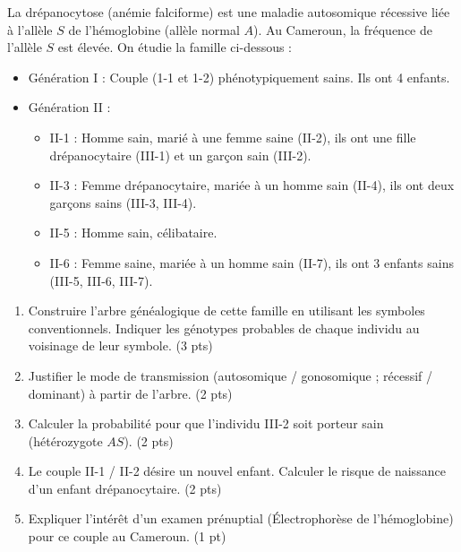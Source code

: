 \documentclass[11pt]{article}
\begin{document}
\begin{exercice}
La drépanocytose (anémie falciforme) est une maladie autosomique récessive liée à l'allèle $S$ de l'hémoglobine (allèle normal $A$). Au Cameroun, la fréquence de l'allèle $S$ est élevée. On étudie la famille ci-dessous :
\begin{itemize}
    \item Génération I : Couple (1-1 et 1-2) phénotypiquement sains. Ils ont 4 enfants.
    \item Génération II : 
        \begin{itemize}
            \item II-1 : Homme sain, marié à une femme saine (II-2), ils ont une fille drépanocytaire (III-1) et un garçon sain (III-2).
            \item II-3 : Femme drépanocytaire, mariée à un homme sain (II-4), ils ont deux garçons sains (III-3, III-4).
            \item II-5 : Homme sain, célibataire.
            \item II-6 : Femme saine, mariée à un homme sain (II-7), ils ont 3 enfants sains (III-5, III-6, III-7).
        \end{itemize}
\end{itemize}
\begin{enumerate}
    \item Construire l'arbre généalogique de cette famille en utilisant les symboles conventionnels. Indiquer les génotypes probables de chaque individu au voisinage de leur symbole. (3 pts)
    \item Justifier le mode de transmission (autosomique / gonosomique ; récessif / dominant) à partir de l'arbre. (2 pts)
    \item Calculer la probabilité pour que l'individu III-2 soit porteur sain (hétérozygote $AS$). (2 pts)
    \item Le couple II-1 / II-2 désire un nouvel enfant. Calculer le risque de naissance d'un enfant drépanocytaire. (2 pts)
    \item Expliquer l'intérêt d'un examen prénuptial (Électrophorèse de l'hémoglobine) pour ce couple au Cameroun. (1 pt)
\end{enumerate}
\end{exercice}
\end{document}
